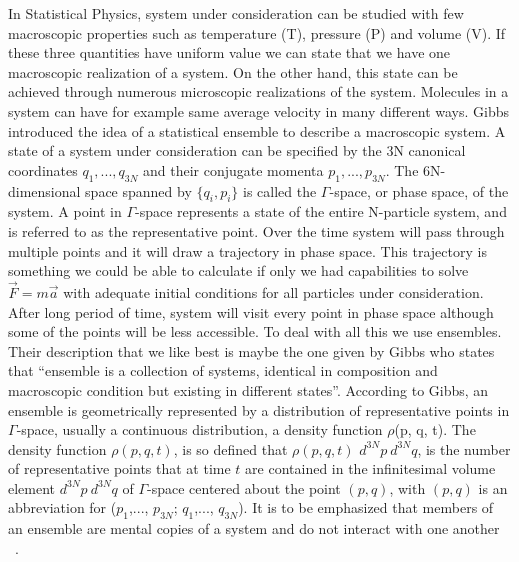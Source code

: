 In Statistical Physics, system under consideration can be studied with few macroscopic properties such as temperature (T), pressure (P) and volume (V). If these three quantities have uniform value we can state that we have one macroscopic realization of a system. On the other hand, this state can be achieved through numerous microscopic realizations of the system. Molecules in a system can have for example same average velocity in many different ways. Gibbs introduced the idea of a statistical ensemble to describe a macroscopic system.
A state of a system under consideration can be specified by the 3N canonical
coordinates $q_1,..., q_{3N}$ and their conjugate momenta $p_1,..., p_{3N}$. The 6N-dimensional space spanned by ${\{q_i, p_i} \}$ is called the $\Gamma$-space, or phase space, of the system. A point in $\Gamma$-space  represents a state of the entire N-particle system, and is referred to as the representative point. Over the time system will pass through multiple points and it will draw a trajectory in phase space. This trajectory is something we could be able to calculate if only we had capabilities to solve $\vec{F} =m\vec{a} $ with adequate initial conditions for all particles under consideration. After long period of time, system will visit every point in phase space although some of the points will be less accessible. To deal with all this we use ensembles. Their description that we like best is maybe the one given by Gibbs who states that ``ensemble is a collection of systems, identical in composition and macroscopic condition but existing in different states''. According to Gibbs, an ensemble is geometrically represented by a distribution of representative points in $\Gamma$-space, usually a continuous distribution, a density function $\rho$(p, q, t). The density function $\rho(p, q, t)$,  is so defined that $\rho(p, q, t)$ $d^{3N}p~d^{3N}q$, is the number of representative points that at time $t$ are contained in the infinitesimal volume element $d^{3N}p~d^{3N}q$ of $\Gamma$-space centered about the point $(p, q)$, with  $(p, q)$ is an abbreviation for ($p_1$,..., $p_{3N}$; $q_1$,..., $q_{3N}$). It is to be emphasized that members of an ensemble are mental copies of a system and do not interact with one another ~\citep{huang2009}.
 
